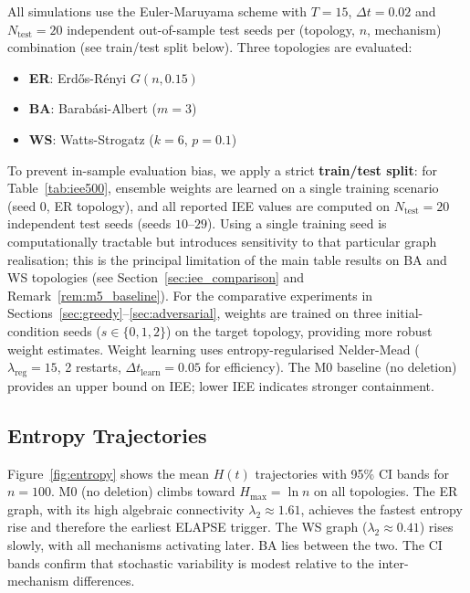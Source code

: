 \documentclass[review,12pt]{elsarticle}
\newcommand{\Hmax}{H_{\max}}
\newcommand{\lambdat}{\lambda_2}
\begin{document}
All simulations use the Euler-Maruyama scheme with $T = 15$, $\Delta t = 0.02$
and $N_{\mathrm{test}} = 20$ independent out-of-sample test seeds per
(topology, $n$, mechanism) combination (see train/test split below).
Three topologies are evaluated:
\begin{itemize}
  \item \textbf{ER}: Erd\H{o}s-R\'enyi $G(n, 0.15)$~\cite{erdos1960evolution}
  \item \textbf{BA}: Barab\'asi-Albert ($m=3$)~\cite{barabasi1999emergence}
  \item \textbf{WS}: Watts-Strogatz ($k=6$, $p=0.1$)~\cite{watts1998collective}
\end{itemize}
To prevent in-sample evaluation bias, we apply a strict \textbf{train/test
split}: for Table~\ref{tab:iee500}, ensemble weights are learned on a single
training scenario (seed 0, ER topology), and all reported IEE values are
computed on $N_{\mathrm{test}}=20$ independent test seeds (seeds $10$--$29$).
Using a single training seed is computationally tractable but introduces
sensitivity to that particular graph realisation; this is the principal
limitation of the main table results on BA and WS topologies
(see Section~\ref{sec:iee_comparison} and Remark~\ref{rem:m5_baseline}).
For the comparative experiments in Sections~\ref{sec:greedy}--\ref{sec:adversarial},
weights are trained on three initial-condition seeds ($s \in \{0,1,2\}$) on
the target topology, providing more robust weight estimates.
Weight learning uses entropy-regularised Nelder-Mead
($\lambda_{\mathrm{reg}}=15$, 2 restarts, $\Delta t_{\mathrm{learn}}=0.05$
for efficiency). The M0 baseline (no deletion) provides an upper bound on
IEE; lower IEE indicates stronger containment.

\subsection{Entropy Trajectories}

Figure~\ref{fig:entropy} shows the mean $H(t)$ trajectories with 95\% CI
bands for $n=100$. M0 (no deletion) climbs toward $\Hmax = \ln n$ on all
topologies. The ER graph, with its high algebraic connectivity
$\lambdat \approx 1.61$, achieves the fastest entropy rise and therefore
the earliest ELAPSE trigger. The WS graph ($\lambdat \approx 0.41$)
rises slowly, with all mechanisms activating later. BA lies between the two.
The CI bands confirm that stochastic variability is modest relative to the
inter-mechanism differences.
\end{document}
